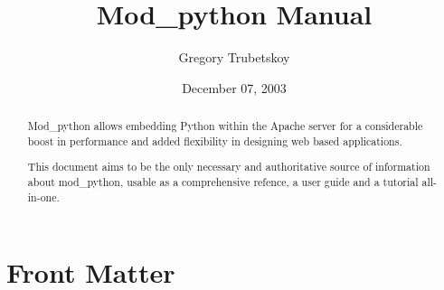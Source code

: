 \documentclass{manual}
\title{Mod\_python Manual}
\author{Gregory Trubetskoy}
\date{December 07, 2003}
\begin{document}
\maketitle

\ifhtml
\chapter*{Front Matter\label{front}}
\fi



\begin{abstract}

\noindent
Mod_python allows embedding Python within the Apache server for a considerable
boost in performance and added flexibility in designing web based
applications.

This document aims to be the only necessary and authoritative source of
information about mod_python, usable as a comprehensive refence, a user guide
and a tutorial all-in-one.

\begin{seealso}
\end{seealso}

\end{abstract}

\tableofcontents

\appendix


\end{document}
